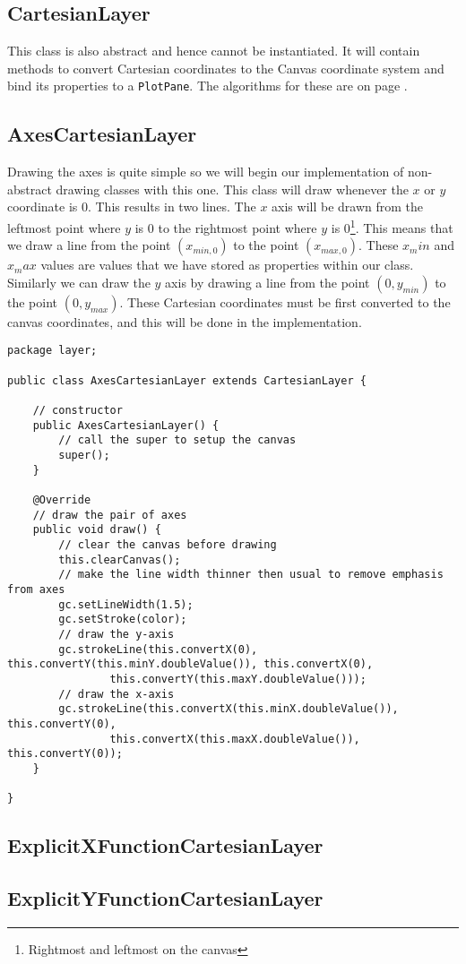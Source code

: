 \documentclass[../../../../main.tex]{subfiles}
\begin{document}
\subsection{CartesianLayer}
This class is also abstract and hence cannot be instantiated. It will contain methods to convert Cartesian coordinates to the Canvas coordinate system and bind its properties to a \texttt{PlotPane}. The algorithms for these are on page \pageref{alg:coordConv}.
\newpage
\subsection{AxesCartesianLayer}
Drawing the axes is quite simple so we will begin our implementation of non-abstract drawing classes with this one. This class will draw whenever the $x$ or $y$ coordinate is 0. This results in two lines. The $x$ axis will be drawn from the leftmost point where $y$ is 0 to the rightmost point where $y$ is 0\footnote{Rightmost and leftmost on the canvas}. This means that we draw a line from the point $(x_{min,0})$ to the point $(x_{max,0})$. These $x_min$ and $x_max$ values are values that we have stored as properties within our class. Similarly we can draw the $y$ axis by drawing a line from the point $(0,y_{min})$ to the point $(0,y_{max})$. These Cartesian coordinates must be first converted to the canvas coordinates, and this will be done in the implementation.
\begin{verbatim}
package layer;

public class AxesCartesianLayer extends CartesianLayer {

	// constructor
	public AxesCartesianLayer() {
		// call the super to setup the canvas
		super();
	}

	@Override
	// draw the pair of axes
	public void draw() {
		// clear the canvas before drawing
		this.clearCanvas();
		// make the line width thinner then usual to remove emphasis from axes
		gc.setLineWidth(1.5);
		gc.setStroke(color);
		// draw the y-axis
		gc.strokeLine(this.convertX(0), this.convertY(this.minY.doubleValue()), this.convertX(0),
				this.convertY(this.maxY.doubleValue()));
		// draw the x-axis
		gc.strokeLine(this.convertX(this.minX.doubleValue()), this.convertY(0),
				this.convertX(this.maxX.doubleValue()), this.convertY(0));
	}

}
\end{verbatim}
\newpage
\subsection{ExplicitXFunctionCartesianLayer}
\newpage
\subsection{ExplicitYFunctionCartesianLayer}
\newpage
\end{document}
